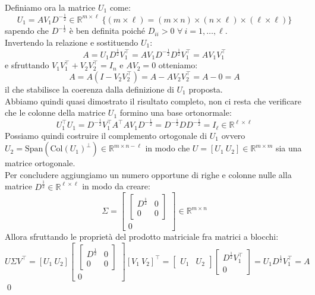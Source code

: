 \documentclass[11pt]{article}
\newcommand{\R}{\mathbb{R}} %
\begin{document}
Definiamo ora la matrice $U_1$ come: $$U_1 = A V_1 D^{-\frac{1}{2}} \in \R^{m \times \ell}\ \lbrace(m \times \ell)=(m \times n)\times(n \times \ell)\times(\ell \times \ell)\rbrace$$ sapendo che $D^{-\frac{1}{2}}$ è ben definita poiché $D_{ii} > 0$ $\forall \ i = 1, \dots, \ell$.\\
Invertendo la relazione e sostituendo $U_1$: $$A=U_1D^{\frac{1}{2}}V_1^\top      =AV_1D^{-\frac12}D^{\frac12}V_1^\top      =AV_1V_1^\top      $$ e sfruttando $V_1V_1^\top      +V_2V_2^\top      =I_n$ e $AV_2=0$  otteniamo: $$A=A\left( I -V_2V_2^\top       \right)=A-AV_2V_2^\top      =A-0=A$$ il che stabilisce la coerenza dalla definizione di $U_1$ proposta.\\
Abbiamo quindi quasi dimostrato il risultato completo, non ci resta che verificare che le colonne della matrice $U_1$ formino una base ortonormale: $$ U_1^\top      U_1=D^{-\frac12}V_1^\top      A^\top      AV_1D^{-\frac12}=D^{-\frac12}DD^{-\frac12}=I_{\ell} \in \R^{\ell \times \ell} $$
Possiamo quindi costruire il complemento ortogonale di $U_1$ ovvero $U_2=\text{Span}(\text{Col}(U_1)^\perp) \in \R^{m \times n-\ell}$ in modo che $U=[U_1 \ U_2] \in \R^{m \times m}$ sia una matrice ortogonale.\\
Per concludere aggiungiamo un numero opportune di righe e colonne nulle alla matrice $D^{\frac12} \in \R^{\ell \times \ell}$ in modo da creare: $$\Sigma=\begin{bmatrix}
  \begin{bmatrix} D^\frac{1}{2} & 0 \\ 0 & 0 \end{bmatrix} \\
  0
\end{bmatrix} \in \R^{m \times n}$$
Allora sfruttando le proprietà del prodotto matriciale fra matrici a blocchi: 
$$U\Sigma V^\top      = [U_1 \ U_2]\begin{bmatrix}
  \begin{bmatrix} D^\frac{1}{2} & 0 \\ 0 & 0 \end{bmatrix} \\
  0
\end{bmatrix}[V_1 \ V_2]^\top      = \begin{bmatrix} U_1 & U_2 \end{bmatrix}
\begin{bmatrix} D^\frac{1}{2}V_1^\top       \\ 0 \end{bmatrix}
= U_1 D^\frac{1}{2} V_1^\top       = A $$\qed
\end{document}
